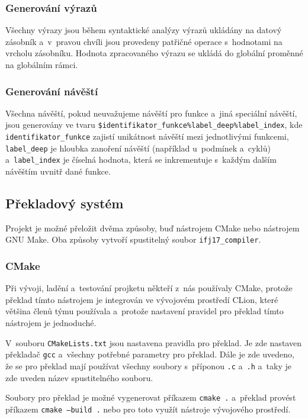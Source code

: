 \documentclass[a4paper, 11pt]{article}
\begin{document}
	\subsubsection{Generování výrazů}

	Všechny výrazy jsou během syntaktické analýzy výrazů ukládány na datový zásobník a~v~pravou
	chvíli jsou provedeny patřičné operace s~hodnotami na vrcholu zásobníku. Hodnota zpracovaného
	výrazu se ukládá do globální proměnné na globálním rámci.

	\subsubsection{Generování návěští}

	Všechna návěští, pokud neuvažujeme návěští pro funkce a~jiná speciální návěští, jsou generovány
	ve tvaru \texttt{\$identifikator\_funkce\%label\_deep\%label\_index}, kde
	\texttt{identifikator\_funkce} zajistí unikátnost návěští mezi jednotlivými funkcemi,
	\texttt{label\_deep} je hloubka zanoření návěští (například u~podmínek a~cyklů)
	a~\texttt{label\_index} je číselná hodnota, která se inkrementuje s~každým dalším návěštím uvnitř
	dané funkce.


	\subsection{Překladový systém}

	Projekt je možné přeložit dvěma způsoby, buď nástrojem CMake nebo nástrojem GNU Make. Oba způsoby vytvoří
	spustitelný soubor \texttt{ifj17\_compiler}.

	\subsubsection{CMake}

	Při vývoji, ladění a~testování projketu někteří z~nás používaly CMake, protože překlad tímto nástrojem
	je integrován ve vývojovém prostředí CLion, které většina členů týmu používala a~protože nastavení pravidel
	pro překlad tímto nástrojem je jednoduché.

	V~souboru \texttt{CMakeLists.txt} jsou nastavena pravidla pro překlad. Je zde nastaven překladač \texttt{gcc}
	a~všechny potřebné parametry pro překlad. Dále je zde uvedeno, že se pro překlad mají používat všechny soubory s~příponou
	\texttt{.c} a~\texttt{.h} a~taky je zde uveden název spustitelného souboru.

	Soubory pro překlad je možné vygenerovat příkazem \texttt{cmake~.} a~překlad provést příkazem \texttt{cmake~--build~.}
	nebo pro toto využít nástroje vývojového prostředí.
\end{document}
